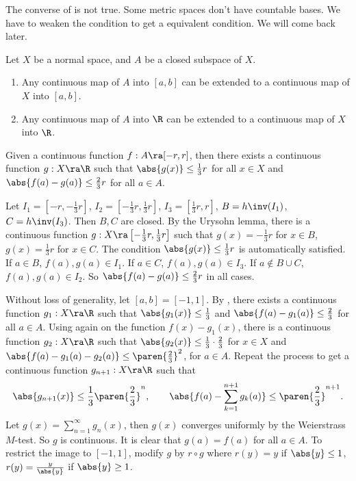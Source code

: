 The converse of  is not true. Some metric spaces don't have countable bases. We have to weaken the condition to get a equivalent condition. We will come back later.


 Let \(X\) be a normal space, and \(A\) be a closed subspace of \(X\).
\begin{enumerate}
    \item Any continuous map of \(A\) into \([a, b]\) can be extended to a continuous map of \(X\) into \([a, b]\).
    \item Any continuous map of \(A\) into \(\R\) can be extended to a continuous map of \(X\) into \(\R\).
\end{enumerate}

\pf {} Given a continuous function \(f : A \ra [-r, r]\), then there exists a continuous function \(g : X \ra \R\) such that \(\abs{g(x)} \leq \frac{1}{3}r\) for all \(x \in X\) and \(\abs{f(a) - g(a)} \leq \frac{2}{3}r\) for all \(a \in A\).

Let \(I_1 = \left[-r, -\frac{1}{3}r\right]\), \(I_2 = \left[-\frac{1}{3}r, \frac{1}{3}r\right]\), \(I_3 = \left[\frac{1}{3}r, r\right]\), \(B = h\inv(I_1)\), \(C = h\inv(I_3)\). Then \(B, C\) are closed. By the Urysohn lemma, there is a continuous function \(g : X \ra \left[-\frac{1}{3}r, \frac{1}{3}r\right]\) such that \(g(x) = -\frac{1}{3}r\) for \(x \in B\), \(g(x) = \frac{1}{3}r\) for \(x \in C\). The condition \(\abs{g(x)} \leq \frac{1}{3}r\) is automatically satisfied. If \(a \in B\), \(f(a), g(a) \in I_1\). If \(a \in C\), \(f(a), g(a) \in I_3\). If \(a \notin B \cup C\), \(f(a), g(a) \in I_2\). So \(\abs{f(a) - g(a)} \leq \frac{2}{3}r\) in all cases.

 Without loss of generality, let \([a, b] = [-1, 1]\). By , there exists a continuous function \(g_1 : X \ra \R\) such that \(\abs{g_1(x)} \leq \frac{1}{3}\) and \(\abs{f(a) - g_1(a)} \leq \frac{2}{3}\) for all \(a \in A\). Using  again on the function \(f(x) - g_1(x)\), there is a continuous function \(g_2 : X \ra \R\) such that \(\abs{g_2(x)} \leq \frac{1}{3} \cdot \frac{2}{3}\) for \(x \in X\) and \(\abs{f(a) - g_1(a) - g_2(a)} \leq \paren{\frac{2}{3}}^2\), for \(a \in A\). Repeat the process to get a continuous function \(g_{n+1} : X \ra \R\) such that
\[
    \abs{g_{n+1}(x)} \leq \frac{1}{3} \paren{\frac{2}{3}}^n, \qquad \abs{f(a) - \sum_{k=1}^{n+1}g_k(a)} \leq \paren{\frac{2}{3}}^{n+1}.
\]
Let \(g(x) = \sum_{n=1}^\infty g_n(x)\), then \(g(x)\) converges uniformly by the Weierstrass \(M\)-test. So \(g\) is continuous. It is clear that \(g(a) = f(a)\) for all \(a \in A\). To restrict the image to \([-1, 1]\), modify \(g\) by \(r \circ g\) where \(r(y) = y\) if \(\abs{y} \leq 1\), \(r(y) = \frac{y}{\abs{y}}\) if \(\abs{y} \geq 1\).

